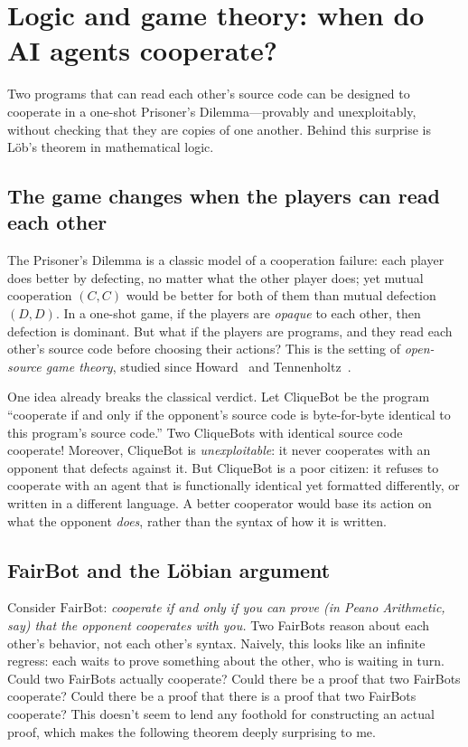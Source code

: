 \section{Logic and game theory: when do AI agents cooperate?}
\label{sec:logic}

Two programs that can read each other's source code can be designed to cooperate in a one-shot Prisoner's Dilemma---provably and unexploitably, without checking that they are copies of one another. Behind this surprise is L\"ob's theorem in mathematical logic.

\subsection{The game changes when the players can read each other}

The Prisoner's Dilemma is a classic model of a cooperation failure: each player does better by defecting, no matter what the other player does; yet mutual cooperation $(C,C)$ would be better for both of them than mutual defection $(D,D)$. In a one-shot game, if the players are \emph{opaque} to each other, then defection is dominant. But what if the players are programs, and they read each other's source code before choosing their actions? This is the setting of \emph{open-source game theory}, studied since Howard~\cite{howard1988} and Tennenholtz~\cite{tennenholtz2004}.

One idea already breaks the classical verdict. Let $\mathrm{CliqueBot}$ be the program ``cooperate if and only if the opponent's source code is byte-for-byte identical to this program's source code.'' Two CliqueBots with identical source code cooperate! Moreover, CliqueBot is \emph{unexploitable}: it never cooperates with an opponent that defects against it. But CliqueBot is a poor citizen: it refuses to cooperate with an agent that is functionally identical yet formatted differently, or written in a different language. A better cooperator would base its action on what the opponent \emph{does}, rather than the syntax of how it is written.

\subsection{FairBot and the L\"obian argument}

Consider $\mathrm{FairBot}$: \emph{cooperate if and only if you can prove (in Peano Arithmetic, say) that the opponent cooperates with you.} Two FairBots reason about each other's behavior, not each other's syntax. Naively, this looks like an infinite regress: each waits to prove something about the other, who is waiting in turn. Could two FairBots actually cooperate? Could there be a proof that two FairBots cooperate? Could there be a proof that there is a proof that two FairBots cooperate? This doesn't seem to lend any foothold for constructing an actual proof, which makes the following theorem deeply surprising to me.

